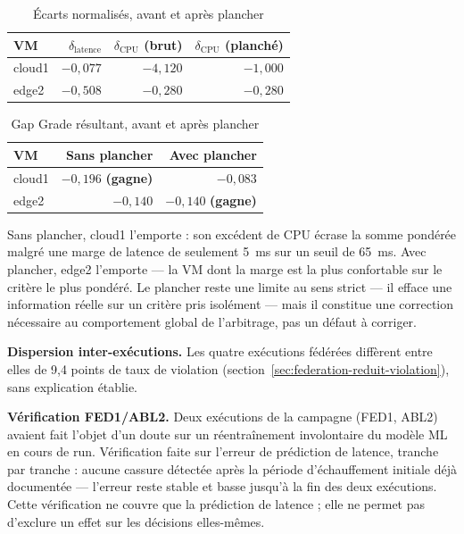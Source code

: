 \begin{table}[H]
    \centering
    \caption{Écarts normalisés, avant et après plancher}
    \label{tab:floor-exemple-ecarts}
    \begin{tabular}{lrrr}
        \toprule
        \textbf{VM} & $\delta_{\text{latence}}$ & $\delta_{\text{CPU}}$ (brut) & $\delta_{\text{CPU}}$ (planché) \\
        \midrule
        cloud1 & $-0{,}077$ & $-4{,}120$ & $-1{,}000$ \\
        edge2  & $-0{,}508$ & $-0{,}280$ & $-0{,}280$ \\
        \bottomrule
    \end{tabular}
\end{table}

\begin{table}[H]
    \centering
    \caption{Gap Grade résultant, avant et après plancher}
    \label{tab:floor-exemple-resultat}
    \begin{tabular}{lrr}
        \toprule
        \textbf{VM} & \textbf{Sans plancher} & \textbf{Avec plancher} \\
        \midrule
        cloud1 & $-0{,}196$ \textbf{(gagne)} & $-0{,}083$ \\
        edge2  & $-0{,}140$ & $-0{,}140$ \textbf{(gagne)} \\
        \bottomrule
    \end{tabular}
\end{table}

Sans plancher, cloud1 l'emporte : son excédent de CPU écrase la somme pondérée malgré une marge de latence de seulement 5~ms sur un seuil de 65~ms. Avec plancher, edge2 l'emporte — la VM dont la marge est la plus confortable sur le critère le plus pondéré. Le plancher reste une limite au sens strict — il efface une information réelle sur un critère pris isolément — mais il constitue une correction nécessaire au comportement global de l'arbitrage, pas un défaut à corriger.

\textbf{Dispersion inter-exécutions.} Les quatre exécutions fédérées diffèrent entre elles de 9,4 points de taux de violation (section~\ref{sec:federation-reduit-violation}), sans explication établie.

\textbf{Vérification FED1/ABL2.} Deux exécutions de la campagne (FED1, ABL2) avaient fait l'objet d'un doute sur un réentraînement involontaire du modèle ML en cours de run. Vérification faite sur l'erreur de prédiction de latence, tranche par tranche : aucune cassure détectée après la période d'échauffement initiale déjà documentée — l'erreur reste stable et basse jusqu'à la fin des deux exécutions. Cette vérification ne couvre que la prédiction de latence ; elle ne permet pas d'exclure un effet sur les décisions elles-mêmes.

